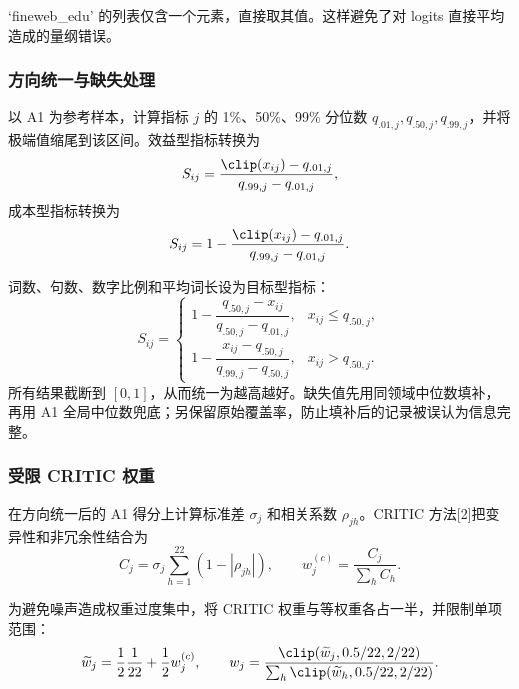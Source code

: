 \documentclass[bwprint]{gmcmthesis}
\begin{document}
        `fineweb\_edu' 的列表仅含一个元素，直接取其值。这样避免了对 logits 直接平均造成的量纲错误。


        \subsubsection{方向统一与缺失处理}   %
        以 A1 为参考样本，计算指标 $j$ 的 1\%、50\%、99\% 分位数 $q_{.01,j},q_{.50,j},q_{.99,j}$，并将极端值缩尾到该区间。效益型指标转换为
        \begin{equation}
        S_{ij}=\frac{\clip(x_{ij})-q_{.01,j}}{q_{.99,j}-q_{.01,j}},
        \label{eq:benefit}
        \end{equation}
        成本型指标转换为
        \begin{equation}
        S_{ij}=1-\frac{\clip(x_{ij})-q_{.01,j}}{q_{.99,j}-q_{.01,j}}.
        \label{eq:cost}
        \end{equation}
        
        词数、句数、数字比例和平均词长设为目标型指标：
        \begin{equation}
        S_{ij}=\begin{cases}
        1-\dfrac{q_{.50,j}-x_{ij}}{q_{.50,j}-q_{.01,j}},&x_{ij}\le q_{.50,j},\\[6pt]
        1-\dfrac{x_{ij}-q_{.50,j}}{q_{.99,j}-q_{.50,j}},&x_{ij}>q_{.50,j}.
        \end{cases}
        \label{eq:target}
        \end{equation}
        所有结果截断到 $[0,1]$，从而统一为越高越好。缺失值先用同领域中位数填补，再用 A1 全局中位数兜底；另保留原始覆盖率，防止填补后的记录被误认为信息完整。
        
        
        \subsubsection{受限 CRITIC 权重}    %
        在方向统一后的 A1 得分上计算标准差 $\sigma_j$ 和相关系数 $\rho_{jh}$。CRITIC 方法[2]把变异性和非冗余性结合为
        \begin{equation}
        C_j=\sigma_j\sum_{h=1}^{22}(1-|\rho_{jh}|),\qquad
        w_j^{(c)}=\frac{C_j}{\sum_hC_h}.
        \label{eq:critic}
        \end{equation}
        
        为避免噪声造成权重过度集中，将 CRITIC 权重与等权重各占一半，并限制单项范围：
        \begin{equation}
        \widetilde w_j=\frac12\frac1{22}+\frac12w_j^{(c)},\qquad
        w_j=\frac{\clip(\widetilde w_j,0.5/22,2/22)}
        {\sum_h\clip(\widetilde w_h,0.5/22,2/22)}.
        \label{eq:weight}
        \end{equation}
        
\end{document}

